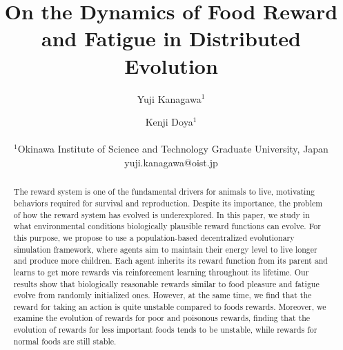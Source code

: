 \documentclass[letterpaper]{article}
\title{On the Dynamics of Food Reward and Fatigue in Distributed Evolution}
\author{
  Yuji Kanagawa$^{1}$ \and
  Kenji Doya$^{1}$ \\
  \mbox{}\\
  $^1$Okinawa Institute of Science and Technology Graduate University, Japan
  yuji.kanagawa@oist.jp
} %
\newcommand{\1}{\mathbb{I} } %
\newcounter{num}
\begin{document}
\maketitle

\begin{abstract}
  The reward system is one of the fundamental drivers for animals to live, motivating behaviors required for survival and reproduction. Despite its importance, the problem of how the reward system has evolved is underexplored. In this paper, we study in what environmental conditions biologically plausible reward functions can evolve. For this purpose, we propose to use a population-based decentralized evolutionary simulation framework, where agents aim to maintain their energy level to live longer and produce more children. Each agent inherits its reward function from its parent and learns to get more rewards via reinforcement learning throughout its lifetime. Our results show that biologically reasonable rewards similar to food pleasure and fatigue evolve from randomly initialized ones. However, at the same time, we find that the reward for taking an action is quite unstable compared to foods rewards. Moreover, we examine the evolution of rewards for poor and poisonous rewards, finding that the evolution of rewards for less important foods tends to be unstable, while rewards for normal foods are still stable.
\end{abstract}




\clearpage




% 
\end{document}
